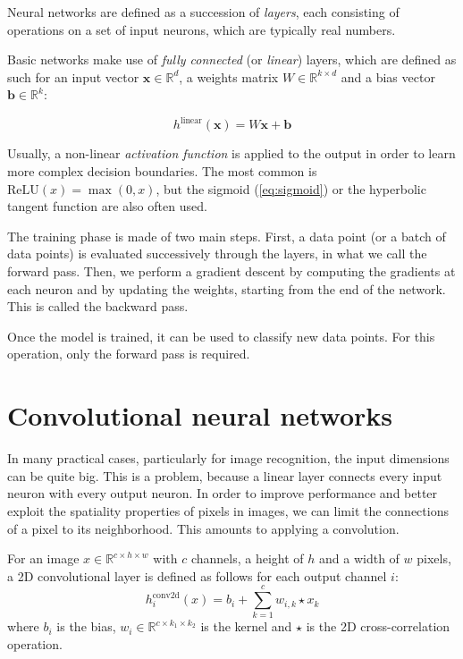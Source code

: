 \documentclass[a4paper,11pt,oneside]{report}
\begin{document}
Neural networks are defined as a succession of \emph{layers}, each consisting of operations on a set of input neurons, which are typically real numbers.

Basic networks make use of \emph{fully connected} (or \emph{linear}) layers, which are defined as such for an input vector $\mathbf{x} \in \mathbb{R}^d$, a weights matrix $W \in \mathbb{R}^{k \times d}$ and a bias vector $\mathbf{b} \in \mathbb{R}^k$:

\begin{equation}\label{eq:linear_layer}
    h^{\mathrm{linear}}(\mathbf{x}) = W \mathbf{x} + \mathbf{b}
\end{equation}

Usually, a non-linear \emph{activation function} is applied to the output in order to learn more complex decision boundaries. 
The most common is $\mathrm{ReLU}(x) = \max(0, x)$, but the sigmoid (\autoref{eq:sigmoid}) or the hyperbolic tangent function are also often used.

The training phase is made of two main steps. 
First, a data point (or a batch of data points) is evaluated successively through the layers, in what we call the forward pass. 
Then, we perform a gradient descent by computing the gradients at each neuron and by updating the weights, starting from the end of the network. 
This is called the backward pass.

Once the model is trained, it can be used to classify new data points. 
For this operation, only the forward pass is required.

\section{Convolutional neural networks}

In many practical cases, particularly for image recognition, the input dimensions can be quite big. 
This is a problem, because a linear layer connects every input neuron with every output neuron. 
In order to improve performance and better exploit the spatiality properties of pixels in images, we can limit the connections of a pixel to its neighborhood. 
This amounts to applying a convolution.

For an image $x \in \mathbb{R}^{c \times h \times w}$ with $c$ channels, a height of $h$ and a width of $w$ pixels, a 2D convolutional layer is defined as follows for each output channel $i$:
\begin{equation}\label{eq:conv2d_layer}
    h_i^{\mathrm{conv2d}}(x) = b_i + \sum_{k=1}^{c} w_{i, k} \star x_{k}
\end{equation}
where $b_i$ is the bias, $w_i \in \mathbb{R}^{c \times k_1 \times k_2}$ is the kernel and $\star$ is the 2D cross-correlation operation.
\end{document}
